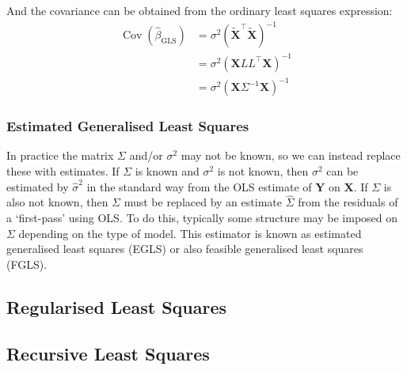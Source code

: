 \documentclass[11pt]{report} %
\begin{document}
And the covariance can be obtained from the ordinary least squares expression:
\begin{align}
\operatorname{Cov}\left(\widehat{\beta}_{\mathrm{GLS}}\right) &= \sigma^{2}\left(\widetilde{\mathbf{X}}^{\top}\widetilde{\mathbf{X}}\right)^{-1} \\
&= \sigma^{2}\left(\mathbf{X}LL^{\top}\mathbf{X}\right)^{-1} \\
&= \sigma^{2}\left(\mathbf{X}\Sigma^{-1}\mathbf{X}\right)^{-1}
\end{align}

\subsubsection{Estimated Generalised Least Squares}

In practice the matrix $\Sigma$ and/or $\sigma^{2}$ may not be known, so we can instead replace these with estimates. If $\Sigma$ is known and $\sigma^{2}$ is not known, then $\sigma^{2}$ can be estimated by $\widehat{\sigma}^{2}$ in the standard way from the OLS estimate of $\mathbf{Y}$ on $\mathbf{X}$. If $\Sigma$ is also not known, then $\Sigma$ must be replaced by an estimate $\widehat{\Sigma}$ from the residuals of a `first-pass' using OLS. To do this, typically some structure may be imposed on $\Sigma$ depending on the type of model. This estimator is known as estimated generalised least squares (EGLS) or also feasible generalised least squares (FGLS).

\subsection{Regularised Least Squares}

\subsection{Recursive Least Squares}
\end{document}

